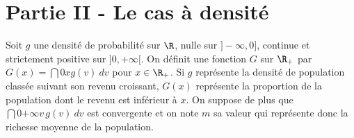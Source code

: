 


\section*{Partie II - Le cas à densité}

\noindent
Soit $g$ une densité de probabilité sur $\R$, nulle sur $]-\infty, 0]$, 
continue et strictement positive sur $]0,+\infty[$. On définit une 
fonction $G$ sur $\R_+$ par $G(x)=\dint{0}{x} g(v) \ dv$ pour $x \in 
\R_+$. Si $g$ représente la densité de population classée suivant son 
revenu croissant, $G(x)$ représente la proportion de la population dont 
le revenu est inférieur à $x$. On suppose de plus que 
$\dint{0}{+\infty} v \, g(v) \ dv$ est convergente et on note $m$ sa 
valeur qui représente donc la richesse moyenne de la population. 


